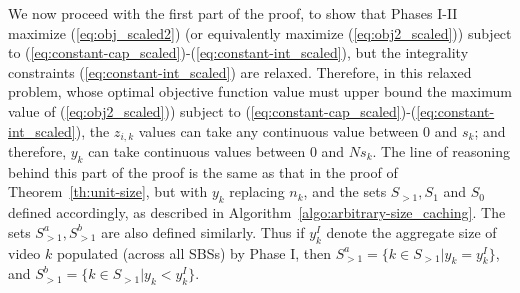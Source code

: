 \documentclass[conference]{IEEEtran}
\begin{document}
We now proceed with the first part of the proof, to show that Phases I-II maximize (\ref{eq:obj_scaled2}) (or equivalently maximize (\ref{eq:obj2_scaled})) subject to (\ref{eq:constant-cap_scaled})-(\ref{eq:constant-int_scaled}), but the integrality constraints (\ref{eq:constant-int_scaled}) are relaxed. Therefore, in this relaxed problem, whose optimal objective function value must upper bound the maximum value of (\ref{eq:obj2_scaled})) subject to (\ref{eq:constant-cap_scaled})-(\ref{eq:constant-int_scaled}), the $z_{i,k}$ values can take any continuous value between $0$ and $s_k$; and therefore, $y_k$ can take continuous values between $0$ and $N s_k$. 
The line of reasoning behind this part of the proof is the same as that in the proof of Theorem~\ref{th:unit-size}, but with $y_k$ replacing $n_k$, and the sets $S_{>1}, S_1$ and $S_0$ defined accordingly, as described in Algorithm~\ref{algo:arbitrary-size_caching}. The sets $S^a_{>1}, S^b_{>1}$ are also defined similarly. Thus if $y^I_k$ denote the aggregate size of video $k$ populated (across all SBSs) by Phase I, then $S^a_{>1} = \{ k \in S_{>1} | y_k = y^I_k \}$, and $S^b_{>1} = \{ k \in S_{>1} | y_k < y^I_k \}$.
\end{document}
